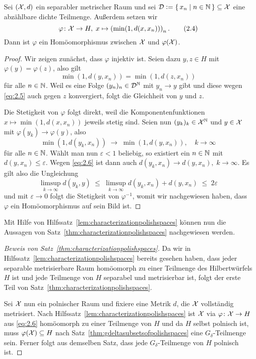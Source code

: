 \documentclass[../main/main.tex]{subfiles}
\begin{document}
	\begin{Hilfssatz}
		\label{lem:characterizationpolishspaces}
		Sei $(\mathcal{X}, d)$ ein separabler metrischer Raum und sei 
		$\mathcal{D} \vcentcolon = \left\{\, x_n \; \middle| \; n \in \mathbb{N} \,\right\} \subseteq \mathcal{X}$ eine abzählbare 
		dichte Teilmenge. Außerdem setzen wir
		\[\varphi \colon \mathcal{X} \to H, \; x \mapsto \left(\min (1, d(x, x_n)) \right)_n  \text{.} \label{eq:2.4} \tag{2.4}\]
		Dann ist $\varphi$ ein Homöomorphismus zwischen $\mathcal{X}$ und $\varphi(\mathcal{X})$.
	\end{Hilfssatz}
	
	\begin{proof}
		Wir zeigen zunächst, dass $\varphi$ injektiv ist. 
		Seien dazu $y, z \in H$ mit $\varphi(y) = \varphi(z)$, also gilt
		\[\min (1, d(y, x_n)) = \min (1, d(z, x_n)) \label{eq:2.5} \tag{2.5}\]
		für alle $n \in \mathbb{N}$. Weil es eine Folge $(y_n)_n \in \mathcal{D}^{\mathbb{N}}$ mit 
		$y_n \to y$ gibt und diese wegen \eqref{eq:2.5} auch gegen $z$ 
		konvergiert, folgt die Gleichheit von $y$ und $z$.
		
		Die Stetigkeit von $\varphi$ folgt direkt, weil die 
		Komponentenfunktionen $x \mapsto \min (1, d(x, x_n))$ jeweils stetig sind. 
		Seien nun $(y_k)_k \in \mathcal{X}^{\mathbb{N}}$ und $y \in \mathcal{X}$ mit $\varphi(y_k) \to \varphi(y)$, 
		also
		\[\min (1, d(y_k, x_n)) \; \to \; \min (1, d(y, x_n)), 
		\quad k \to \infty \label{eq:2.6} \tag{2.6}\]
		für alle $n \in \mathbb{N}$. Wählt man nun $\varepsilon < 1$ beliebig, 
		so existiert ein $n \in \mathbb{N}$ mit $d(y, x_n) \leq \varepsilon$. 
		Wegen \eqref{eq:2.6} ist dann auch
		$d(y_k, x_n) \to d(y, x_n), \; k \to \infty$. Es gilt also die Ungleichung
		$$\limsup_{k \to \infty} d(y_k, y) \; \leq \; 
		\limsup_{k \to \infty} d(y_k, x_n) + d(y, x_n) \; \leq \; 2\varepsilon$$
		und mit $\varepsilon \to 0$ folgt die Stetigkeit von $\varphi^{-1}$, 
		womit wir nachgewiesen haben, dass $\varphi$ ein Homöomorphismus auf sein Bild ist. 
	\end{proof}

	Mit Hilfe von Hilfssatz~\ref{lem:characterizationpolishspaces} können nun die Aussagen von
	Satz~\ref{thm:characterizationpolishspaces} nachgewiesen werden.
	
	\begin{proof}[Beweis von Satz~\ref{thm:characterizationpolishspaces}]
		Da wir in Hilfssatz~\ref{lem:characterizationpolishspaces} bereits 
		gesehen haben, dass jeder separable metrisierbare Raum homöomorph zu einer 
		Teilmenge des Hilbertwürfels $H$ ist und jede Teilmenge von $H$ separabel und metrisierbar ist,
		folgt der erste Teil von Satz~\ref{thm:characterizationpolishspaces}. 
		
		Sei $\mathcal{X}$ nun ein polnischer Raum und fixiere eine Metrik $d$, die $\mathcal{X}$ vollständig metrisiert. 
		Nach Hilfssatz~\ref{lem:characterizationpolishspaces} ist $\mathcal{X}$ via $\varphi \colon \mathcal{X} \to H$ aus \eqref{eq:2.6}
		homöomorph zu einer Teilmenge von $H$ und da $H$ selbst polnisch ist, muss $\varphi(\mathcal{X}) \subseteq H$ nach 
		Satz~\ref{thm:gdeltasubsetsofpolishspaces} eine $G_\delta$-Teilmenge sein.
		Ferner folgt aus demselben Satz, dass jede $G_\delta$-Teilmenge von $H$ polnisch ist.
	\end{proof}
\end{document}
